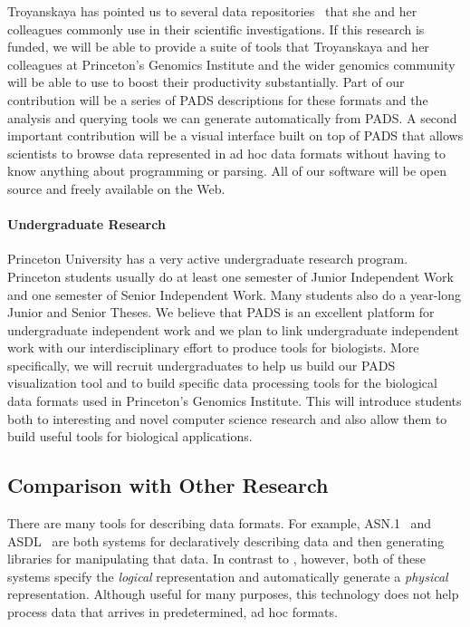\documentclass[11pt]{article}
\begin{document}
Troyanskaya has pointed us to several data
repositories~\cite{grid,bind,geneontology} that she and her colleagues
commonly use in their scientific investigations.  If this research is
funded, we will be able to provide a suite of tools that Troyanskaya
and her colleagues at Princeton's Genomics Institute and the wider
genomics community will be able to use to boost their productivity
substantially.  Part of our contribution will be a series of PADS
descriptions for these formats and the analysis and querying tools we
can generate automatically from PADS.  A second important contribution
will be a visual interface built on top of PADS that allows scientists
to browse data represented in ad hoc data formats without having to
know anything about programming or parsing.  All of our software will
be open source and freely available on the Web.

\paragraph*{Undergraduate Research}
Princeton University has a very active undergraduate research program.
Princeton students usually do at least one semester of
Junior Independent Work and one semester of Senior Independent Work. 
Many students also do a year-long
Junior and Senior Theses.  We believe that PADS is an excellent
platform for undergraduate independent work and we plan to link
undergraduate independent work with our interdisciplinary effort to
produce tools for biologists.
More specifically, we will recruit undergraduates to help us
build our PADS visualization tool and to build
specific data processing tools for the biological data formats
used in Princeton's Genomics Institute.
This will introduce students both to interesting and novel
computer science research and also allow them to build useful
tools for biological applications. 

\subsection{Comparison with Other Research}
\label{ssec:related}

There are many tools for describing data formats. For example,
\textsc{ASN.1}~\cite{asn} and \textsc{ASDL}~\cite{asdl} are both
systems for declaratively describing data and then generating
libraries for manipulating that data.  In contrast to \pads{},
however, both of these systems specify the {\em logical\/} representation
and automatically generate a {\em physical\/} representation.
Although useful for many purposes, this technology does not help
process data that arrives in predetermined, ad hoc formats.
\end{document}
